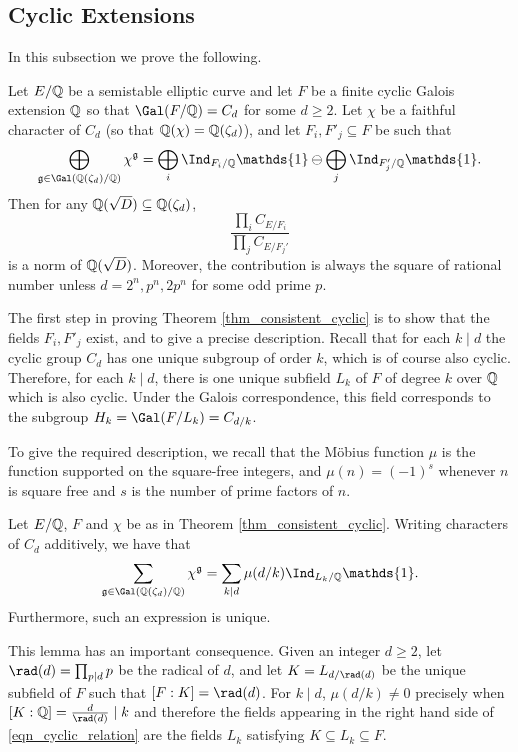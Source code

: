
\subsection{Cyclic Extensions}
In this subsection we prove the following. 
\begin{thm}\label{thm_consistent_cyclic}
    Let $E/\mathbb{Q}$ be a semistable elliptic curve and let $F$ be a finite cyclic Galois extension $\mathbb{Q}$ so that $\Gal(F/\QQ)=C_d$ for some $d\geq 2$. Let $\chi$ be a faithful character of $C_d$ (so that $\mathbb{Q}(\chi)=\mathbb{Q}(\zeta_d)$), and let $F_i,F'_j\subseteq F$ be such that
    $$\bigoplus_{\mathfrak{g}\in\Gal(\QQ(\zeta_d)/\QQ)}\chi^{\mathfrak{g}}=\bigoplus_i\Ind_{F_i/\QQ}\mathds{1}\ominus\bigoplus_j\Ind_{F'_j/\QQ}\mathds{1}.$$
    Then for any $\mathbb{Q}(\sqrt{D})\subseteq\mathbb{Q}(\zeta_d)$,
    $$\frac{\prod_i C_{E/F_i}}{\prod_j C_{E/F_j'}}$$
    is a norm of $\mathbb{Q}(\sqrt{D})$. Moreover, the contribution is always the square of rational number unless $d=2^n, p^n,2p^n$ for some odd prime $p$.
\end{thm}

The first step in proving Theorem \ref*{thm_consistent_cyclic} is to show that the fields $F_i, F'_j$ exist, and to give a precise description. Recall that for each $k\mid d$ the cyclic group $C_d$ has one unique subgroup of order $k$, which is of course also cyclic. Therefore, for each $k\mid d$, there is one unique subfield $L_k$ of $F$ of degree $k$ over $\mathbb{Q}$ which is also cyclic. Under the Galois correspondence, this field corresponds to the subgroup $H_k=\Gal(F/L_k)=C_{d/k}$.

To give the required description, we recall that the Möbius function $\mu$ is the function supported on the square-free integers, and $\mu(n)=(-1)^s$ whenever $n$ is square free and $s$ is the number of prime factors of $n$.

\begin{lemma}\label{lem_cyclic_decomp}
    Let $E/\mathbb{Q}$, $F$ and $\chi$ be as in Theorem \ref*{thm_consistent_cyclic}. Writing characters of $C_d$ additively, we have that
    \begin{equation}\label{eqn_cyclic_relation}
        \sum_{\mathfrak{g}\in\Gal(\QQ(\zeta_d)/\QQ)}\chi^{\mathfrak{g}}=\sum_{k\mid d}\mu(d/k)\Ind_{L_k/\QQ}\mathds{1}.
    \end{equation}
    Furthermore, such an expression is unique.
\end{lemma}

\begin{rem}\label{rem_radical}
    This lemma has an important consequence. Given an integer $d\geq2$, let $\rad(d)=\prod_{p\mid d}p$ be the radical of $d$, and let $K=L_{d/\rad(d)}$ be the unique subfield of $F$ such that $[F:K]=\rad(d)$. For $k\mid d$, $\mu(d/k)\neq 0$ precisely when $[K:\QQ]=\frac{d}{\rad(d)}\mid k$ and therefore the fields appearing in the right hand side of \eqref{eqn_cyclic_relation} are the fields $L_k$ satisfying $K\subseteq L_k\subseteq F$. 
\end{rem}

